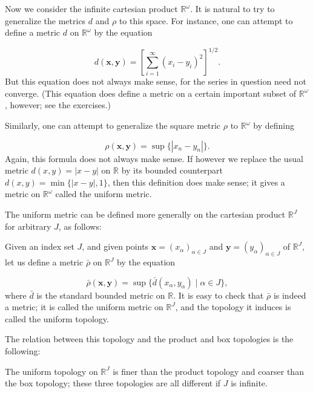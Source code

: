 Now we consider the infinite cartesian product \(\mathbb{R}^{\omega }\). It is natural to try to generalize the metrics \(d\) and \(\rho\) to this space. For instance, one can attempt to define a metric \(d\) on \(\mathbb{R}^{\omega }\) by the equation

\[
d( {\mathbf{x},\mathbf{y}}) = {[ \mathop{\sum }\limits_{{i = 1}}^{\infty }{( x_{i} - y_{i}) }^{2}] }^{1/2}.
\]
But this equation does not always make sense, for the series in question need not converge. (This equation does define a metric on a certain important subset of \(\mathbb{R}^{\omega }\), however; see the exercises.)

Similarly, one can attempt to generalize the square metric \(\rho\) to \(\mathbb{R}^{\omega }\) by defining

\[
\rho ( {\mathbf{x},\mathbf{y}}) = \sup \{ | {x_{n} - y_{n}}| \}.
\]
Again, this formula does not always make sense. If however we replace the usual metric \(d( {x,y}) = | {x - y}|\) on \(\mathbb{R}\) by its bounded counterpart \(d( {x,y}) = \min \{ | {x - y}|,1\}\), then this definition does make sense; it gives a metric on \(\mathbb{R}^{\omega }\) called the uniform metric.

The uniform metric can be defined more generally on the cartesian product \(\mathbb{R}^{J}\) for arbitrary \(J\), as follows:

\begin{definition}
 Given an index set \(J\), and given points \(\mathbf{x} = {( x_{\alpha }) }_{\alpha \in J}\) and \(\mathbf{y} = {( y_{\alpha }) }_{\alpha \in J}\) of \(\mathbb{R}^{J}\), let us define a metric \(\bar{\rho }\) on \(\mathbb{R}^{J}\) by the equation

 \[
 \bar{\rho }( {\mathbf{x},\mathbf{y}}) = \sup \{ \bar{d}( {x_{\alpha },y_{\alpha }}) \mid \alpha \in J\},
 \]
 where \(\bar{d}\) is the standard bounded metric on \(\mathbb{R}\). It is easy to check that \(\bar{\rho }\) is indeed a metric; it is called the uniform metric on \(\mathbb{R}^{J}\), and the topology it induces is called the uniform topology.
\end{definition}

The relation between this topology and the product and box topologies is the following:

\begin{theorem}
\label{thm:\thetheorem}
 The uniform topology on \(\mathbb{R}^{J}\) is finer than the product topology and coarser than the box topology; these three topologies are all different if \(J\) is infinite.
\end{theorem}

